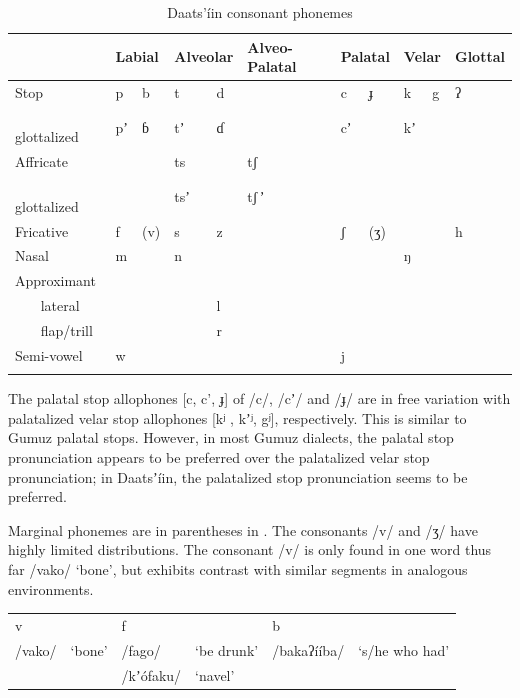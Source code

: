 \documentclass[output=paper]{langsci/langscibook}
\begin{document}
\begin{table}
\begin{tabularx}{\textwidth}{lXXXXXXXXXXXX} \lsptoprule & \multicolumn{2}{X}{Labial} & \multicolumn{2}{X}{Alveolar} & \multicolumn{2}{X}{Alveo-Palatal} & \multicolumn{2}{X}{Palatal} & \multicolumn{2}{X}{Velar} & \multicolumn{2}{X}{Glottal} \\
\midrule
Stop & p   &     b & t    &      d &  &  & c     &    ɟ & k    &    g & ʔ& \\
{\ \ \ } glottalized & pʼ    &   ɓ & tʼ     &    ɗ & &  & cʼ & & kʼ & & & \\
Affricate & & & ts & & tʃ & & &  &  & & & \\
{\ \ \ } glottalized & & & tsʼ & & tʃ\,ʼ & & & & & & & \\
Fricative & f    &    (v) & s     &     z &  & & ʃ    &     (ʒ) & &  & h & \\
Nasal & m & & n & & &  & &  & ŋ & & & \\
Approximant & & & & & & & & & & & & \\
{\ \ \ } lateral & &  & & l & &  & &  & &  & & \\
{\ \ \ } flap/trill & &  & & r & & & & & & & & \\
Semi-vowel & w & & &  &  & & j & & &  & & \\
\lspbottomrule
\end{tabularx}
\caption{Daats’íin consonant phonemes}
\label{tab:ahlandc:1}
\end{table}

The palatal stop allophones [c, c’, ɟ] of /c/, /cʼ/ and /ɟ/ are in free variation with palatalized velar stop allophones [kʲ , kʼʲ, gʲ], respectively. This is similar to Gumuz palatal stops. However, in most Gumuz dialects, the palatal stop pronunciation appears to be preferred over the palatalized velar stop pronunciation; in Daatsʼíin, the palatalized stop pronunciation seems to be preferred. 

Marginal phonemes are in parentheses in . The consonants /v/ and /ʒ/ have highly limited distributions. The consonant /v/ is only found in one word thus far /vako/ ‘bone’, but exhibits contrast with similar segments in analogous environments. 

\ea
\begin{tabular}{llllll}
v & & f & & b & \\
/vako/   &  ‘bone’  &   /fago/  &   ‘be drunk’  & /bakaʔííba/ & ‘s/he who had’  \\           
& & /kʼ\'{o}faku/ &  ‘navel’ & & \\
\end{tabular}
\z
\end{document}
